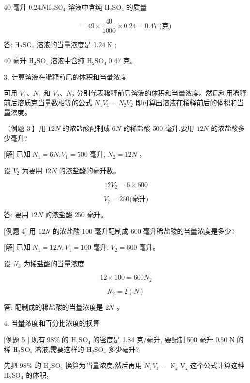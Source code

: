 \documentclass[10pt]{article}
\begin{document}
40 毫升 \({0.24N}{\mathrm{H}}_{2}{\mathrm{{SO}}}_{4}\) 溶液中含纯 \({\mathrm{H}}_{2}{\mathrm{{SO}}}_{4}\) 的质量

\[
= {49} \times \frac{40}{1000} \times {0.24} = {0.47}\text{ (克) }
\]

答: \({\mathrm{H}}_{2}{\mathrm{{SO}}}_{4}\) 溶液的当量浓度是 \({0.24}\mathrm{\;N}\) ;

40 毫升 \({\mathrm{H}}_{2}{\mathrm{{SO}}}_{4}\) 溶液中含纯 \({\mathrm{H}}_{2}{\mathrm{{SO}}}_{4}\) 0.47 克。

3. 计算溶液在稀释前后的体积和当量浓度

可用 \({V}_{1}\text{、}{N}_{1}\) 和 \({V}_{2}\text{、}{N}_{2}\) 分别代表稀释前后溶液的体积和当量浓度。然后利用稀释前后溶质克当量数相等的公式 \({N}_{1}{V}_{1} = {N}_{2}{V}_{2}\) 即可算出溶液在稀释前后的体积和当量浓度。

〔例题 3 】用 \({12N}\) 的浓盐酸配制成 \({6N}\) 的稀盐酸 500 毫升,要用 \({12N}\) 的浓盐酸多少毫升?

[解] 已知 \({N}_{1} = {6N},{V}_{1} = {500}\) 毫升, \({N}_{2} = {12N}\) 。

设 \({V}_{2}\) 为要用 \({12N}\) 的浓盐酸的毫升数。

\[
{12}{V}_{2} = 6 \times {500}
\]

\[
{V}_{2} = {250}\text{(毫升)}
\]

答: 要用 \({12N}\) 的浓盐酸 250 毫升。

[例题 4] 用 \({12N}\) 的浓盐酸 100 毫升配制成 600 毫升稀盐酸的当量浓度是多少?

[解] 已知 \({N}_{1} = {12N},{V}_{1} = {100}\) 毫升, \({V}_{2} = {600}\) 毫升。

设 \({N}_{3}\) 为稀盐酸的当量浓度

\[
{12} \times {100} = {600}{N}_{2}
\]

\[
{N}_{2} = 2\left( N\right)
\]

答: 配制成的稀盐酸的当量浓度是 \({2N}\) 。

4. 当量浓度和百分比浓度的换算

[例题 5 ] 现有 \({98}\%\) 的 \({\mathrm{H}}_{2}{\mathrm{{SO}}}_{4}\) 的密度是 1.84 克/毫升, 要配制 500 毫升 \({0.50}\mathrm{\;N}\) 的稀 \({\mathrm{H}}_{2}{\mathrm{{SO}}}_{4}\) 溶液,需要这样的 \({\mathrm{H}}_{2}{\mathrm{{SO}}}_{4}\) 多少毫升?

先把 \({98}\%\) 的 \({\mathrm{H}}_{2}{\mathrm{{SO}}}_{4}\) 换算为当量浓度,然后再用 \({N}_{1}{V}_{1} =\) \({\mathrm{N}}_{2}{\mathrm{\;V}}_{2}\) 这个公式计算这种 \({\mathrm{H}}_{2}{\mathrm{{SO}}}_{4}\) 的体积。
\end{document}
